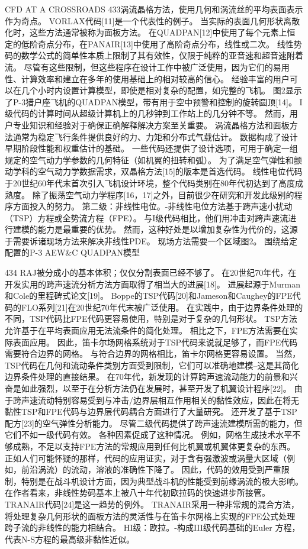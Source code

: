 \documentclass[UTF8,11pt,a4paper,openany,fontset=fandol]{ctexbook}
\begin{document}
CFD AT A CROSSROADS 433涡流晶格方法，使用几何和涡流丝的平均表面表示作为奇点。 VORLAX代码[11]是一个代表性的例子。 当实际的表面几何形状离散化时，这些方法通常被称为面板方法。 在QUADPAN[12]中使用了每个元素上恒定的低阶奇点分布，在PANAIR[13]中使用了高阶奇点分布，线性或二次。 线性势码的数学公式的简单性本质上限制了其有效性，仅限于纯粹的亚音速和超音速附着流。 尽管有这些限制，但这些程序在设计工作中被广泛使用，因为它们的易用性、计算效率和建立在多年的使用基础上的相对较高的信心。 经验丰富的用户可以在几个小时内设置计算模型，即使是相对复杂的配置，如完整的飞机。 图2显示了P-3猎户座飞机的QUADPAN模型，带有用于空中预警和控制的旋转圆顶[14]。 I级代码的计算时间从超级计算机上的几秒钟到工作站上的几分钟不等。 然而，用户专业知识和经验对于确保正确解释解决方案至关重要。 涡流晶格方法和面板方法通常为稳定飞行条件提供良好的力、力矩和分布式气载估计。 数据构成了设计早期阶段性能和权重估计的基础。 一些代码还提供了设计选项，可用于确定一组规定的空气动力学参数的几何特征（如机翼的扭转和弧）。 为了满足空气弹性和颤动学科的空气动力学数据需求，双晶格方法[15]的版本是首选代码。 线性电位代码于20世纪60年代末首次引入飞机设计环境，整个代码类别在80年代初达到了高度成熟度。 除了振荡空气动力学程序[16，17]之外，目前很少在研究和开发此级别的程序方面投入的努力。 第二级：非线性电位。-非线性电位方法基于跨声速小扰动（TSP）方程或全势流方程（FPE）。 与I级代码相比，他们用冲击对跨声速流进行建模的能力是最重要的优势。 然而，这种好处是以增加复杂性为代价的，这源于需要诉诸现场方法来解决非线性PDE。 现场方法需要一个区域图2。 围绕给定配置的P-3 AEW\&C QUADPAN模型

434 RAJ被分成小的基本体积；仅仅分割表面已经不够了。 在20世纪70年代，在开发实用的跨声速流分析方法方面取得了相当大的进展[18]。 进展起源于Murman和Cole的里程碑式论文[19]。 Boppe的TSP代码[20]和Jameson和Caughey的FPE代码的FLO系列[21]在20世纪70年代末被广泛使用。 在实践中，由于边界条件处理的不同，TSP代码比FPE代码更容易使用，特别是对于复杂的几何形状。 TSP方法允许基于在平均表面应用无法流条件的简化处理。 相比之下，FPE方法需要在实际表面应用。 因此，笛卡尔场网格系统对于TSP代码来说就足够了，而FPE代码需要符合边界的网格。 与符合边界的网格相比，笛卡尔网格更容易设置。 当然，TSP代码在几何和流动条件类别方面受到限制，它们可以准确地建模--这是其简化边界条件处理的直接结果。 在70年代，新发现的计算跨声速流动能力的前景和兴奋是如此强烈，以至于在分析方法仍在发展时，甚至开发了机翼设计程序[22]。 由于跨声速流动特别容易受到与冲击/边界层相互作用相关的黏性效应，因此在将无黏性TSP和FPE代码与边界层代码耦合方面进行了大量研究。 还开发了基于TSP配方[23]的空气弹性分析能力。 尽管二级代码提供了跨声速流建模所需的能力，但它们不如一级代码有效。 各种因素促成了这种情况。 例如，网格生成技术水平不够成熟，不足以支持FPE方法的常规应用到任何比机翼或机翼体更复杂的东西。 正如人们可能怀疑的那样，代码的应用证实，对于含有强激波或涡量大区域（例如，前沿涡流）的流动，溶液的准确性下降了。 因此，代码的效用受到严重限制，特别是在战斗机设计方面，因为典型战斗机的性能受到前缘涡流的极大影响。 在作者看来，非线性势码基本上被八十年代初欧拉码的快速进步所接管。 TRANAIR代码[24]是这一趋势的例外。 TRANAIR采用一种非常规的混合方法，将处理复杂几何形状的面板方法的灵活性与在笛卡尔网格上实现的FPE公式处理跨子流的非线性的能力相结合。 HI级：欧拉。-构成III级代码基础的Euler 方程，代表N-S方程的最高级非黏性近似。
\end{document}
